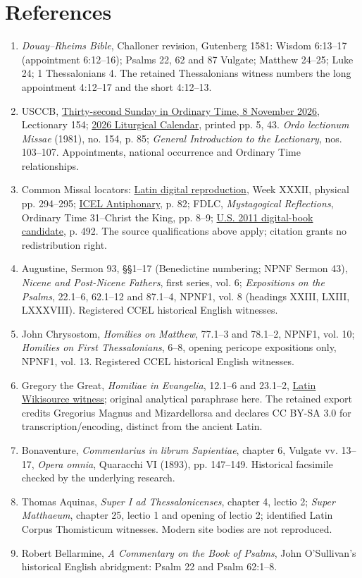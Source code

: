 \section{References}
\begin{enumerate}
\item \textit{Douay--Rheims Bible}, Challoner revision, Gutenberg 1581: Wisdom 6:13--17 (appointment 6:12--16); Psalms 22, 62 and 87 Vulgate; Matthew 24--25; Luke 24; 1 Thessalonians 4. The retained Thessalonians witness numbers the long appointment 4:12--17 and the short 4:12--13.
\item USCCB, \href{https://bible.usccb.org/bible/readings/110826.cfm}{Thirty-second Sunday in Ordinary Time, 8 November 2026}, Lectionary 154; \href{https://www.usccb.org/resources/2026cal.pdf}{2026 Liturgical Calendar}, printed pp. 5, 43. \textit{Ordo lectionum Missae} (1981), no. 154, p. 85; \textit{General Introduction to the Lectionary}, nos. 103--107. Appointments, national occurrence and Ordinary Time relationships.
\item Common Missal locators: \href{https://media.musicasacra.com/books/latin_missal2002.pdf}{Latin digital reproduction}, Week XXXII, physical pp. 294--295; \href{https://www.liturgyoffice.org.uk/Missal/Music/Antiphonary.pdf}{ICEL Antiphonary}, p. 82; FDLC, \textit{Mystagogical Reflections}, Ordinary Time 31--Christ the King, pp. 8--9; \href{https://archive.org/download/Roman-Missal-Third-Edition/Roman\%20Missal.pdf}{U.S. 2011 digital-book candidate}, p. 492. The source qualifications above apply; citation grants no redistribution right.
\item Augustine, Sermon 93, §§1--17 (Benedictine numbering; NPNF Sermon 43), \textit{Nicene and Post-Nicene Fathers}, first series, vol. 6; \textit{Expositions on the Psalms}, 22.1--6, 62.1--12 and 87.1--4, NPNF1, vol. 8 (headings XXIII, LXIII, LXXXVIII). Registered CCEL historical English witnesses.
\item John Chrysostom, \textit{Homilies on Matthew}, 77.1--3 and 78.1--2, NPNF1, vol. 10; \textit{Homilies on First Thessalonians}, 6--8, opening pericope expositions only, NPNF1, vol. 13. Registered CCEL historical English witnesses.
\item Gregory the Great, \textit{Homiliae in Evangelia}, 12.1--6 and 23.1--2, \href{https://la.wikisource.org/wiki/Homiliarum_in_Evangelia}{Latin Wikisource witness}; original analytical paraphrase here. The retained export credits Gregorius Magnus and Mizardellorsa and declares CC BY-SA 3.0 for transcription/encoding, distinct from the ancient Latin.
\item Bonaventure, \textit{Commentarius in librum Sapientiae}, chapter 6, Vulgate vv. 13--17, \textit{Opera omnia}, Quaracchi VI (1893), pp. 147--149. Historical facsimile checked by the underlying research.
\item Thomas Aquinas, \textit{Super I ad Thessalonicenses}, chapter 4, lectio 2; \textit{Super Matthaeum}, chapter 25, lectio 1 and opening of lectio 2; identified Latin Corpus Thomisticum witnesses. Modern site bodies are not reproduced.
\item Robert Bellarmine, \textit{A Commentary on the Book of Psalms}, John O'Sullivan's historical English abridgment: Psalm 22 and Psalm 62:1--8.
\end{enumerate}
